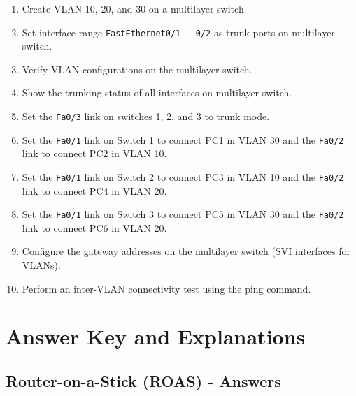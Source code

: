 \documentclass[a4paper]{book}
\begin{document}
\begin{enumerate}
    \item Create VLAN 10, 20, and 30 on a multilayer switch
    \item Set interface range \texttt{FastEthernet0/1 - 0/2} as trunk ports on multilayer switch.
    \item Verify VLAN configurations on the multilayer switch.
    \item Show the trunking status of all interfaces on multilayer switch.
    \item Set the \texttt{Fa0/3} link on switches 1, 2, and 3 to trunk mode.
    \item Set the \texttt{Fa0/1} link on Switch 1 to connect PC1 in VLAN 30 and the \texttt{Fa0/2} link to connect PC2 in VLAN 10.
    \item Set the \texttt{Fa0/1} link on Switch 2 to connect PC3 in VLAN 10 and the \texttt{Fa0/2} link to connect PC4 in VLAN 20.
    \item Set the \texttt{Fa0/1} link on Switch 3 to connect PC5 in VLAN 30 and the \texttt{Fa0/2} link to connect PC6 in VLAN 20.
    \item Configure the gateway addresses on the multilayer switch (SVI interfaces for VLANs).
    \item Perform an inter-VLAN connectivity test using the ping command.

    
\end{enumerate}

\part{Answer Key and Explanations}


\chapter{Router-on-a-Stick (ROAS) - Answers}
\end{document}
